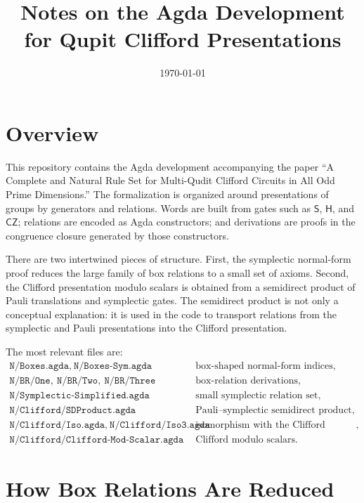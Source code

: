 \documentclass[a4paper,11pt]{article}
\title{Notes on the Agda Development for Qupit Clifford Presentations}
\author{}
\date{\today}
\newcommand{\sGate}{\mathsf S}
\newcommand{\hGate}{\mathsf H}
\newcommand{\czGate}{\mathsf {CZ}}
\newcommand{\code}[1]{\texttt{#1}}
\begin{document}
\maketitle

\section{Overview}

This repository contains the Agda development accompanying the paper
``A Complete and Natural Rule Set for Multi-Qudit Clifford Circuits in
All Odd Prime Dimensions.''  The formalization is organized around
presentations of groups by generators and relations.  Words are built
from gates such as $\sGate$, $\hGate$, and $\czGate$; relations are
encoded as Agda constructors; and derivations are proofs in the
congruence closure generated by those constructors.

There are two intertwined pieces of structure.
First, the symplectic normal-form proof reduces the large family of
box relations to a small set of axioms.  Second, the Clifford
presentation modulo scalars is obtained from a semidirect product of
Pauli translations and symplectic gates.  The semidirect product is
not only a conceptual explanation: it is used in the code to transport
relations from the symplectic and Pauli presentations into the
Clifford presentation.

The most relevant files are:
\[
\begin{array}{ll}
\code{N/Boxes.agda},\ \code{N/Boxes-Sym.agda}
  & \text{box-shaped normal-form indices},\\
\code{N/BR/One},\ \code{N/BR/Two},\ \code{N/BR/Three}
  & \text{box-relation derivations},\\
\code{N/Symplectic-Simplified.agda}
  & \text{small symplectic relation set},\\
\code{N/Clifford/SDProduct.agda}
  & \text{Pauli--symplectic semidirect product},\\
\code{N/Clifford/Iso.agda},\ \code{N/Clifford/Iso3.agda}
  & \text{isomorphism with the Clifford presentation},\\
\code{N/Clifford/Clifford-Mod-Scalar.agda}
  & \text{Clifford modulo scalars}.
\end{array}
\]

\section{How Box Relations Are Reduced}
\end{document}
